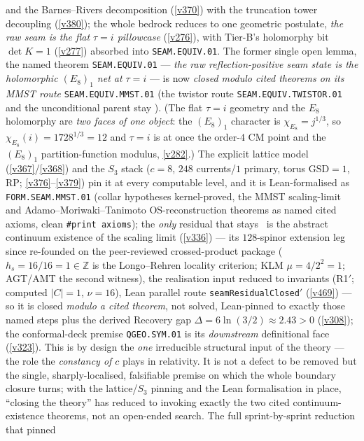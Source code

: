 \documentclass[11pt,a4paper]{article}
\newcommand{\Z}{\mathbb{Z}}
\begin{document}
and the Barnes--Rivers decomposition (\vref{v370}) with the truncation tower decoupling (\vref{v380}); the whole
bedrock reduces to one geometric postulate, \emph{the raw seam is the flat $\tau{=}i$ pillowcase} (\vref{v276}), with
Tier-B's holomorphy bit $\det K{=}1$ (\vref{v277}) absorbed into \texttt{SEAM.EQUIV.01}.
The former single open lemma, the named theorem \texttt{SEAM.EQUIV.01} --- \emph{the raw reflection-positive
seam state is the holomorphic $(E_8)_1$ net at $\tau{=}i$} --- is now \emph{closed modulo cited theorems on its
MMST route} \texttt{SEAM.EQUIV.MMST.01} (the twistor route \texttt{SEAM.EQUIV.TWISTOR.01} and the unconditional
parent stay \mO). (The
flat $\tau{=}i$ geometry and the $E_8$ holomorphy are \emph{two faces of one object}: the $(E_8)_1$ character is
$\chi_{E_8}{=}j^{1/3}$, so $\chi_{E_8}(i){=}1728^{1/3}{=}12$ and $\tau{=}i$ is at once the order-$4$ CM point and the
$(E_8)_1$ partition-function modulus, \vref{v282}.) The explicit lattice model (\vref{v367}/\vref{v368}) and the
$S_3$ stack ($c{=}8$, $248$ currents/$1$ primary, torus $\mathrm{GSD}{=}1$, RP; \vref{v376}--\vref{v379}) pin it at
every computable level, and it is Lean-formalised as \texttt{FORM.SEAM.MMST.01} (collar hypotheses kernel-proved,
the MMST scaling-limit and Adamo--Moriwaki--Tanimoto OS-reconstruction theorems as named cited axioms, clean
\texttt{\#print axioms}); the \emph{only} residual that stays \mO\ is the abstract continuum existence of the scaling
limit (\vref{v336}) --- its $128$-spinor extension leg since re-founded on the peer-reviewed crossed-product package
($h_s{=}16/16{=}1{\in}\Z$ is the Longo--Rehren locality criterion; KLM $\mu{=}4/2^2{=}1$; AGT/AMT the second
witness), the realisation input reduced to invariants (R1$'$; computed $|C|{=}1$, $\nu{=}16$), Lean parallel route
\texttt{seamResidualClosed$'$} (\vref{v469}) --- so it is closed \emph{modulo a cited theorem},
not solved, Lean-pinned to exactly those named steps plus the derived Recovery gap
$\Delta=6\ln(3/2)\approx2.43>0$ (\vref{v308}); the conformal-deck premise
\texttt{QGEO.SYM.01} is its \emph{downstream} definitional face (\vref{v323}). This is by design the
\emph{one} irreducible structural input of the theory --- the role the \emph{constancy of $c$} plays in
relativity. It is not a defect to be removed but the single, sharply-localised, falsifiable premise on which
the whole boundary closure turns; with the lattice/$S_3$ pinning and the Lean formalisation in place,
``closing the theory'' has reduced to invoking exactly the two cited continuum-existence theorems, not an
open-ended search. The full sprint-by-sprint reduction that pinned
\end{document}
